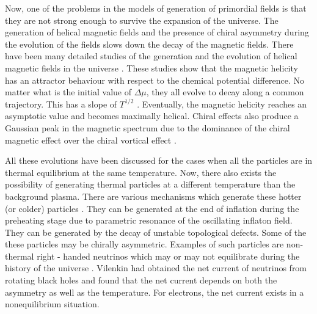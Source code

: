 \documentclass{ws-mpla}
\begin{document}
 
Now, one of the problems in the models of generation of primordial fields is that they are not strong enough to survive the expansion of the universe.
The generation of helical magnetic fields and the presence of chiral asymmetry during the evolution of the fields slows down the decay of the magnetic fields. 
There have been many detailed studies of the generation and the evolution of helical magnetic fields in the universe \cite{tashiro,tina}. These studies show that 
the magnetic helicity has an attractor behaviour with respect to the chemical potential difference. No matter what is the initial value of $\Delta\mu$, 
they all evolve to decay along a common trajectory. This has a slope of $T^{1/2}$ \cite{joyce}. Eventually, the magnetic helicity reaches an asymptotic value and becomes 
maximally helical. Chiral effects also produce a Gaussian peak in the magnetic spectrum due to the dominance of the chiral magnetic effect over the chiral 
vortical effect \cite{tashiro}. 


All these evolutions have been discussed for the cases when all the particles are in thermal equilibrium at the same temperature. Now, there also exists the 
possibility of generating thermal particles at a different temperature than the background plasma. There are various mechanisms which generate these hotter (or colder)
particles \cite{falkowski}. They can be generated at the end of inflation during the preheating stage due to parametric resonance of the oscillating inflaton field. They can be generated by the 
decay of unstable topological defects. Some of the these particles may be chirally asymmetric. Examples of such particles are non-thermal right - handed 
neutrinos which may or may not equilibrate during the history of the universe \cite{chen}. Vilenkin \cite{vilenkin} had obtained the net current of neutrinos 
from rotating black holes and found that the net current depends on both the asymmetry as well as the temperature. For electrons, the net current exists in a 
nonequilibrium situation. 
\end{document}
